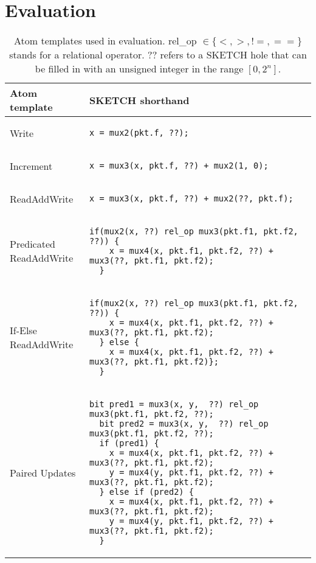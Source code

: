 \section{Evaluation}
\label{s:eval}

\begin{table*}[!t]
  \begin{scriptsize}
  \begin{tabular}{|p{}|p{}|}
  \hline
  Atom template & SKETCH shorthand\\
  \hline
  Write &
  {\begin{lstlisting}[style=customctable]
  x = mux2(pkt.f, ??);
  \end{lstlisting}} \\
  \hline
  Increment &
  {\begin{lstlisting}[style=customctable]
  x = mux3(x, pkt.f, ??) + mux2(1, 0);
  \end{lstlisting}} \\
  \hline
  ReadAddWrite &
  {\begin{lstlisting}[style=customctable]
  x = mux3(x, pkt.f, ??) + mux2(??, pkt.f);
  \end{lstlisting}} \\
  \hline
  \pbox{0.15\textwidth}
  {Predicated\\
  ReadAddWrite} &
  {\begin{lstlisting}[style=customctable]
  if(mux2(x, ??) rel_op mux3(pkt.f1, pkt.f2, ??)) {
    x = mux4(x, pkt.f1, pkt.f2, ??) + mux3(??, pkt.f1, pkt.f2);
  }
  \end{lstlisting}} \\
  \hline
  \pbox{0.15\textwidth}
  {If-Else\\
   ReadAddWrite} &
  {\begin{lstlisting}[style=customctable]
  if(mux2(x, ??) rel_op mux3(pkt.f1, pkt.f2, ??)) {
    x = mux4(x, pkt.f1, pkt.f2, ??) + mux3(??, pkt.f1, pkt.f2);
  } else {
    x = mux4(x, pkt.f1, pkt.f2, ??) + mux3(??, pkt.f1, pkt.f2)};
  }
  \end{lstlisting}} \\
  \hline
  Paired Updates &
  {\begin{lstlisting}[style=customctable]
  bit pred1 = mux3(x, y,  ??) rel_op mux3(pkt.f1, pkt.f2, ??);
  bit pred2 = mux3(x, y,  ??) rel_op mux3(pkt.f1, pkt.f2, ??);
  if (pred1) {
    x = mux4(x, pkt.f1, pkt.f2, ??) + mux3(??, pkt.f1, pkt.f2);
    y = mux4(y, pkt.f1, pkt.f2, ??) + mux3(??, pkt.f1, pkt.f2);
  } else if (pred2) {
    x = mux4(x, pkt.f1, pkt.f2, ??) + mux3(??, pkt.f1, pkt.f2);
    y = mux4(y, pkt.f1, pkt.f2, ??) + mux3(??, pkt.f1, pkt.f2);
  }
  \end{lstlisting}} \\
  \hline
  \end{tabular}
\end{scriptsize}
  \caption{Atom templates used in evaluation. rel\_op $\in \{<, >, != , ==\}$ stands for a relational operator. ?? refers to a SKETCH hole that can be filled in with an unsigned integer in the range $[0, 2^n]$.}
  \label{tab:templates}
\end{table*}

